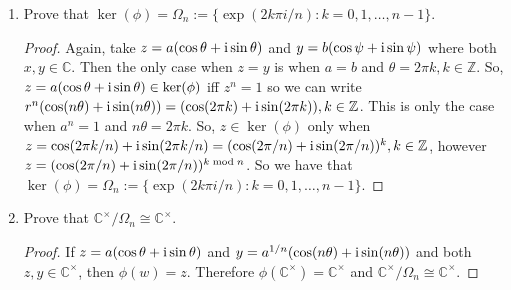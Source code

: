 \documentclass[a4paper]{article}
\newcommand{\ii}{\textup{i}}									%
\newcommand{\bb}[1]{\mathbb{#1}}								%
\begin{document}
\begin{enumerate}[leftmargin=*, label=(\textbf{\arabic*})]
\begin{enumerate}[leftmargin=*, label=(\textbf{\alph*})]
\begin{proof}
Take some $z$ and $y \in \bb{C}^\times$.  Then we can write $z = a(\cos \theta + \ii \sin \theta)$ and $y = b(\cos \psi + \ii \sin \psi)$ and $a,b > 0$ with $\theta, \psi \in [0,2\pi)$.  Via DeMoivre's theorem we have that 
$$\phi(zy)=(zy)^{n}=[a(\cos\theta + \ii \sin\theta)b(\cos\psi + \ii \sin\psi)]^n=a^n b^n [\cos(\theta + \psi) + \ii \sin(\theta + \psi)]^n$$
$$=a^n b^n [\cos(n\theta + n\psi) + \ii \sin(n\theta + n\psi)]$$
$$=a^n[\cos(n\theta) + \ii \sin(n\theta)] b^n [\cos(n\psi) + \ii \sin(n\psi)] = z^n y^n = \phi(z) \phi(y)$$
Therefore, it is established that $\phi$ is a homomorphism.  
\end{proof}


\item Prove that $\ker(\phi) = \Omega_n := \{ \exp(2 k \pi i / n) : k =0,1, \dots, n- 1\}$. 

\begin{proof}
Again, take $z = a(\cos \theta + \ii \sin \theta)$ and $y = b(\cos \psi + \ii \sin \psi)$ where both $x,y \in \bb{C}$.  Then the only case when $z=y$ is when $a=b$ and $\theta=2\pi k, k \in \bb{Z}$.  So, $z = a(\cos\theta + \ii \sin\theta) \in \ker(\phi)$ iff $z^n = 1$ so we can write $r^n (\cos(n\theta) + \ii \sin(n\theta)) = (\cos(2\pi k) + \ii \sin(2\pi k)), k \in \bb{Z}$.  This is only the case when $a^{n} = 1$ and $n\theta = 2\pi k$.  So, $z \in \ker(\phi)$ only when $z = \cos(2 \pi k/ n) + \ii \sin(2\pi k/n) = (\cos(2 \pi/n) + \ii \sin(2 \pi/n))^k, k \in \bb{Z}$, however $z = (\cos(2 \pi/n) + \ii \sin(2 \pi/n))^{k \bmod n}$.  So we have that $\ker(\phi) = \Omega_n := \{ \exp(2 k \pi i / n) : k =0,1, \dots, n- 1\}$.  
\end{proof}

\item Prove that $\bb{C}^\times/\Omega_n \cong \bb{C}^\times$.

\begin{proof}
If $z = a(\cos\theta + \ii\sin\theta)$ and $y = a^{1/n}(\cos(n\theta) + \ii\sin(n\theta))$ and both $z,y \in \bb{C}^\times$, then $\phi(w) = z$.  Therefore $\phi(\bb{C}^\times) = \bb{C}^\times$ and $\bb{C}^\times/\Omega_n \cong \bb{C}^\times$.  
\end{proof}

\end{enumerate}

\end{enumerate}
\end{document}
